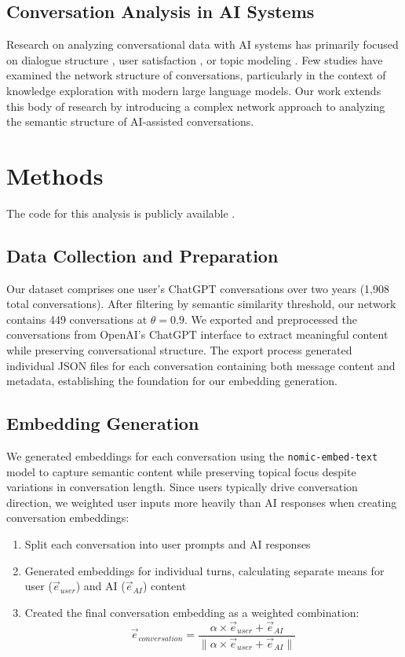 \documentclass{svproc}
\begin{document}
\subsection{Conversation Analysis in AI Systems}

Research on analyzing conversational data with AI systems has primarily focused on dialogue structure \cite{serban2016}, user satisfaction \cite{venkatesh2018}, or topic modeling \cite{zeng2019}. Few studies have examined the network structure of conversations, particularly in the context of knowledge exploration with modern large language models. Our work extends this body of research by introducing a complex network approach to analyzing the semantic structure of AI-assisted conversations.


\section{Methods}

The code for this analysis is publicly available \cite{chatgpt-complex-net}.

\subsection{Data Collection and Preparation}

Our dataset comprises one user's ChatGPT conversations over two years (1,908 total conversations). After filtering by semantic similarity threshold, our network contains 449 conversations at $\theta = 0.9$. We exported and preprocessed the conversations from OpenAI's ChatGPT interface to extract meaningful content while preserving conversational structure. The export process generated individual JSON files for each conversation containing both message content and metadata, establishing the foundation for our embedding generation.

\subsection{Embedding Generation}

We generated embeddings for each conversation using the \texttt{nomic-embed-text} \cite{nomicembed} model to capture semantic content while preserving topical focus despite variations in conversation length. Since users typically drive conversation direction, we weighted user inputs more heavily than AI responses when creating conversation embeddings:

\begin{enumerate}
    \item Split each conversation into user prompts and AI responses
    \item Generated embeddings for individual turns, calculating separate means for user ($\vec{e}_{user}$) and AI ($\vec{e}_{AI}$) content
    \item Created the final conversation embedding as a weighted combination:
    \begin{equation}
    \vec{e}_{conversation} = \frac{\alpha \times \vec{e}_{user} + \vec{e}_{AI}}{\|\alpha \times \vec{e}_{user} + \vec{e}_{AI}\|}
    \end{equation}
\end{enumerate}
\end{document}
